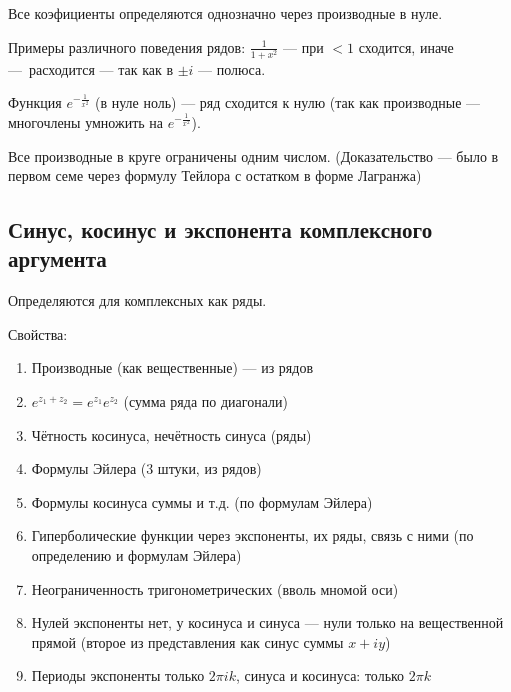 \documentclass[12pt, a4paper, oneside]{memoir}
\begin{document}
\begin{theorem}

    Все коэфициенты определяются однозначно через производные в нуле.
\end{theorem}

Примеры различного поведения рядов: $\frac{1}{1 + x^2}$ — при $<1$ сходится,
иначе — расходится — так как в $±i$ — полюса.

Функция $e^{-\frac{1}{x^2}}$ (в нуле ноль) — ряд сходится к нулю (так как производные — многочлены умножить на $e^{-\frac{1}{x^2}}$).

\begin{theorem}

    Все производные в круге ограничены одним числом. (Доказательство — было в первом семе через формулу Тейлора с остатком в форме Лагранжа)
\end{theorem}




\subsection{Синус, косинус и экспонента комплексного аргумента}

Определяются для комплексных как ряды.

Свойства:

\begin{enumerate}
    \item Производные (как вещественные) — из рядов
    \item $e^{z_1 + z_2} = e^{z_1} e^{z_2}$ (сумма ряда по диагонали)
    \item Чётность косинуса, нечётность синуса (ряды)
    \item Формулы Эйлера (3 штуки, из рядов)
    \item Формулы косинуса суммы и т.д. (по формулам Эйлера)
    \item Гиперболические функции через экспоненты, их ряды, связь с ними (по определению и формулам Эйлера)
    \item Неограниченность тригонометрических (вволь мномой оси)
    \item Нулей экспоненты нет, у косинуса и синуса — нули только на вещественной прямой (второе из представления как синус суммы $x + i y$)
    \item Периоды экспоненты только $2\pi i k$, синуса и косинуса: только $2 \pi k$
\end{enumerate}
\end{document}
